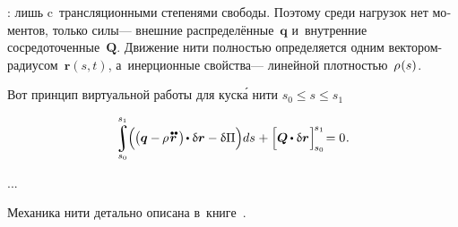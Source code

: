 \begin{otherlanguage}{russian}

 :
   лишь c~трансляционными степенями свободы.
Поэтому среди нагрузок нет моментов, только  силы\:--- внешние распределённые~$\bm{q}$ и~внутренние сосредоточенные~$\bm{Q}$.
Движение нити полностью определяется одним вектором-радиусом~${\bm{r}(s,t)}$, а~инерционные свойства\:--- линейной плотностью~${\rho\hspace{.12ex}(s)}$.

Вот принцип виртуальной работы для куск\'{а} нити ${s_0 \leq s \leq s_1}$

\nopagebreak\vspace{-0.25em}\begin{equation}
\scalebox{0.95}{$
\displaystyle \integral\displaylimits_{\raisemath{.05em}{\mathclap{s_0}}}^{\raisemath{.15em}{\mathclap{s_1}}}
$}
\hspace{-0.25ex} \Bigl( \hspace{-0.1ex}
\bigl( \bm{q} - \hspace{-0.12ex} \rho \hspace{.2ex} \mathdotdotabove{\bm{r}} \hspace{.36ex} \bigr)
\hspace{-0.25ex} \dotp \variation{\bm{r}}
- \variation{\Pi}
\Bigr) ds
\hspace{.1ex} + \Bigl[
\bm{Q} \hspace{-0.1ex} \dotp \variation{\bm{r}}
\hspace{.12ex} \Bigr]_{\hspace{-0.25ex}s_0}^{\hspace{-0.25ex}s_1}
\hspace{-0.4ex} = 0 \hspace{.1ex} .
\end{equation}

...


Механика нити детально описана в~книге~\cite{merkin-threadmechanics}.

\end{otherlanguage}


